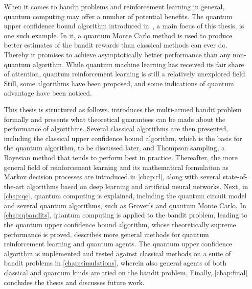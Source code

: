 When it comes to bandit problems and reinforcement learning in general, quantum computing may offer a number of potential benefits.
The quantum upper confidence bound algorithm introduced in~\autocite{wan2022}, a main focus of this thesis, is one such example.
In it, a quantum Monte Carlo method is used to produce better estimates of the bandit rewards than classical methods can ever do.
Thereby it promises to achieve asymptotically better performance than any non-quantum algorithm.
While quantum machine learning has received its fair share of attention, quantum reinforcement learning is still a relatively unexplored field.
Still, some algorithms have been proposed, and some indications of quantum advantage have been noticed.

This thesis is structured as follows.
 introduces the multi-armed bandit problem formally and presents what theoretical guarantees can be made about the performance of algorithms.
Several classical algorithms are then presented, including the classical upper confidence bound algorithm, which is the basis for the quantum algorithm, to be discussed later, and Thompson sampling, a Bayesian method that tends to perform best in practice.
Thereafter, the more general field of reinforcement learning and its mathematical formulation as Markov decision processes are introduced in \cref{chap:rl}, along with several state-of-the-art algorithms based on deep learning and artificial neural networks.
Next, in \cref{chap:qc}, quantum computing is explained, including the quantum circuit model and several quantum algorithms, such as Grover's and quantum Monte Carlo.
In \cref{chap:qbandits}, quantum computing is applied to the bandit problem, leading to the quantum upper confidence bound algorithm, whose theoretically supreme performance is proved.
 describes more general methods for quantum reinforcement learning and quantum agents.
The quantum upper confidence algorithm is implemented and tested against classical methods on a suite of bandit problems in \cref{chap:simulations}, wherein also general agents of both classical and quantum kinds are tried on the bandit problem.
Finally, \cref{chap:final} concludes the thesis and discusses future work.